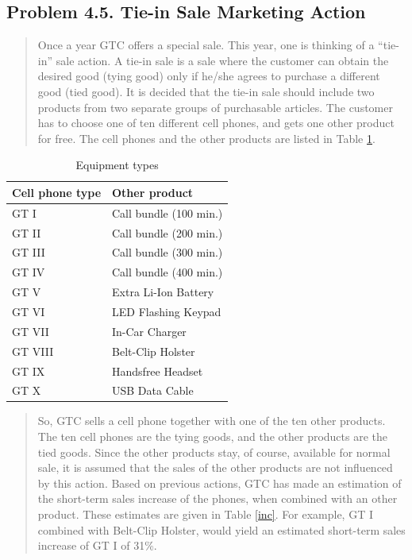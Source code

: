 \subsection{Problem 4.5. Tie-in Sale Marketing Action}

\begin{quote}Once a year GTC offers a special sale. This year, one is thinking of a ``tie-in'' sale
action. A tie-in sale is a sale where the customer can obtain the desired good (tying
good) only if he/she agrees to purchase a different good (tied good). It is decided that
the tie-in sale should include two products from two separate groups of purchasable
articles. The customer has to choose one of ten different cell phones, and gets one
other product for free. The cell phones and the other products are listed in Table \ref{equip}.\end{quote}

\begin{table}[H]
	\centering
	\caption{Equipment types}
	\begin{tabular}{l||l}\hline
Cell phone type & Other product \\ \hline
GT I & Call bundle (100 min.) \\
GT II & Call bundle (200 min.) \\
GT III & Call bundle (300 min.) \\
GT IV & Call bundle (400 min.) \\
GT V & Extra Li-Ion Battery \\
GT VI & LED Flashing Keypad \\
GT VII & In-Car Charger \\
GT VIII & Belt-Clip Holster \\
GT IX & Handsfree Headset \\
GT X & USB Data Cable\\ \hline
	\end{tabular}
	\label{equip}
\end{table}

\begin{quote}So, GTC sells a cell phone together with one of the ten other products. The ten
cell phones are the tying goods, and the other products are the tied goods. Since the
other products stay, of course, available for normal sale, it is assumed that the sales
of the other products are not influenced by this action.
Based on previous actions, GTC has made an estimation of the short-term sales
increase of the phones, when combined with an other product. These estimates are
given in Table \ref{inc}. For example, GT I combined with Belt-Clip Holster, would yield
an estimated short-term sales increase of GT I of 31\%.\end{quote}

